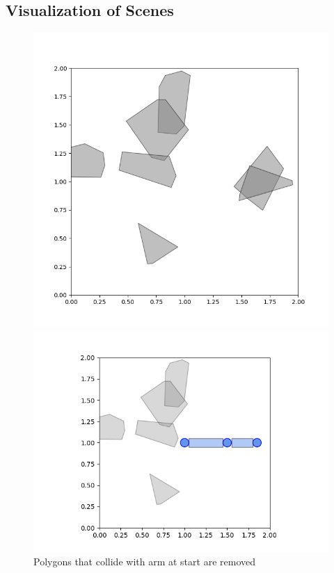 \documentclass{article}
\begin{document}
\subsection{Visualization of Scenes}

\begin{figure}[htbp]
  \centering
  \begin{minipage}{0.45\textwidth}
    \includegraphics[width=\linewidth]{part4_without_arm.png}
  \end{minipage}\hfill
  \begin{minipage}{0.45\textwidth}
    \includegraphics[width=\linewidth]{part4_with_arm.png}
  \end{minipage}
    \caption{Polygons that collide with arm at start are removed}
\end{figure}
\end{document}
